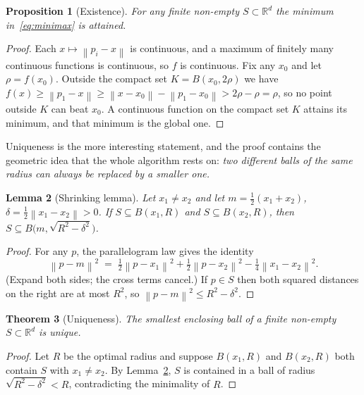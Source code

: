 \documentclass[11pt,a4paper]{article}
\theoremstyle{plain}
\newtheorem{theorem}{Theorem}[section]
\newtheorem{proposition}[theorem]{Proposition}
\newtheorem{lemma}[theorem]{Lemma}
\theoremstyle{definition}
\theoremstyle{remark}
\newcommand{\R}{\mathbb{R}}
\newcommand{\norm}[1]{\left\lVert #1 \right\rVert}
\begin{document}
\begin{proposition}[Existence]
  \label{prop:existence}
  For any finite non-empty $S\subset\R^d$ the minimum in~\eqref{eq:minimax} is
  attained.
\end{proposition}

\begin{proof}
  Each $x\mapsto\norm{p_i-x}$ is continuous, and a maximum of finitely many
  continuous functions is continuous, so $f$ is continuous. Fix any $x_0$ and let
  $\rho=f(x_0)$. Outside the compact set $K=B(x_0,2\rho)$ we have
  $f(x) \ge \norm{p_1-x} \ge \norm{x-x_0}-\norm{p_1-x_0} > 2\rho-\rho = \rho$,
  so no point outside $K$ can beat $x_0$. A continuous function on the compact
  set $K$ attains its minimum, and that minimum is the global one.
\end{proof}

Uniqueness is the more interesting statement, and the proof contains the geometric
idea that the whole algorithm rests on: \emph{two different balls of the same
radius can always be replaced by a smaller one.}

\begin{lemma}[Shrinking lemma]
  \label{lem:shrink}
  Let $x_1\ne x_2$ and let $m=\tfrac12(x_1+x_2)$, $\delta=\tfrac12\norm{x_1-x_2}>0$.
  If $S\subseteq B(x_1,R)$ and $S\subseteq B(x_2,R)$, then
  $S \subseteq B\bigl(m,\sqrt{R^2-\delta^2}\bigr)$.
\end{lemma}

\begin{proof}
  For any $p$, the parallelogram law gives the identity
  \[
    \norm{p-m}^2
      \;=\; \tfrac12\norm{p-x_1}^2 + \tfrac12\norm{p-x_2}^2 - \tfrac14\norm{x_1-x_2}^2 .
  \]
  (Expand both sides; the cross terms cancel.) If $p\in S$ then both squared
  distances on the right are at most $R^2$, so
  $\norm{p-m}^2 \le R^2-\delta^2$.
\end{proof}

\begin{theorem}[Uniqueness]
  \label{thm:unique}
  The smallest enclosing ball of a finite non-empty $S\subset\R^d$ is unique.
\end{theorem}

\begin{proof}
  Let $R$ be the optimal radius and suppose $B(x_1,R)$ and $B(x_2,R)$ both
  contain $S$ with $x_1\ne x_2$. By Lemma~\ref{lem:shrink}, $S$ is contained in a
  ball of radius $\sqrt{R^2-\delta^2}<R$, contradicting the minimality of $R$.
\end{proof}
\end{document}
